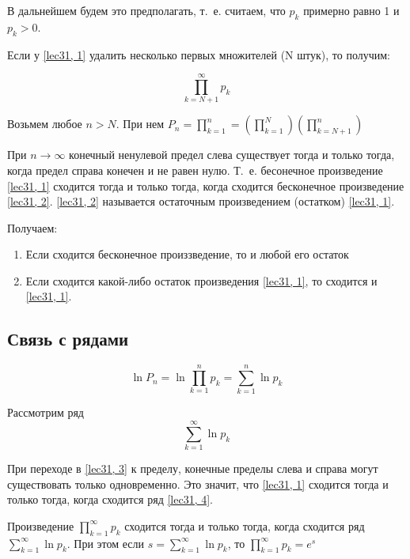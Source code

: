 \documentclass[../../main.tex]{subfiles}
\begin{document}
	В дальнейшем будем это предполагать, т.~е. считаем, что $p_k$ примерно равно 1 и $p_k > 0$.
		
	Если у \eqref{lec31, 1} удалить несколько первых множителей (N штук), то получим:
		
	\begin{equation} \label{lec31, 2}
	\prod\limits_{k = N + 1}^{\infty} p_k
	\end{equation}
		
	Возьмем любое $n > N$. При нем $P_n = \prod\limits_{k = 1}^{n} = \left(\prod\limits_{k = 1}^{N}\right)\left(\prod\limits_{k = N + 1}^{n}\right)$
		
	При $n \to \infty$ конечный ненулевой предел слева существует тогда и только тогда, когда предел справа конечен и не равен нулю. Т.~е. бесонечное произведение \eqref{lec31, 1} сходится тогда и только тогда, когда сходится бесконечное произведение \eqref{lec31, 2}. \eqref{lec31, 2} называется остаточным произведением (остатком) \eqref{lec31, 1}.
		
	Получаем: 
		
	\begin{enumerate}[label={\alph*)}]
		\item Если сходится бесконечное произзведение, то и любой его остаток
			
		\item Если сходится какой-либо остаток произведения \eqref{lec31, 1}, то сходится и \eqref{lec31, 1}.
		\end{enumerate}
	
	\subsection{Связь с рядами}
	
	\begin{equation}\label{lec31, 3}
	 \ln P_n = \ln \prod\limits_{k = 1}^{n} p_k = \sum\limits_{k = 1}^{n} \ln p_k
	\end{equation}
	
	Рассмотрим ряд
	\begin{equation}\label{lec31, 4}
	\sum\limits_{k = 1}^{\infty} \ln p_k
	\end{equation}
	
	При переходе в \eqref{lec31, 3} к пределу, конечные пределы слева и справа могут существовать только одновременно. Это значит, что \eqref{lec31, 1} сходится тогда и только тогда, когда сходится ряд \eqref{lec31, 4}.
	
	\begin{thm}\label{lec31:thm1} 
		Произведение $\prod\limits_{k = 1}^{\infty} p_k$ сходится тогда и только тогда, когда сходится ряд $\sum\limits_{k = 1}^{\infty} \ln p_k$. При этом если $s = \sum\limits_{k = 1}^{\infty} \ln p_k$, то $\prod\limits_{k = 1}^{\infty} p_k = e^s$
	\end{thm}
\end{document}
